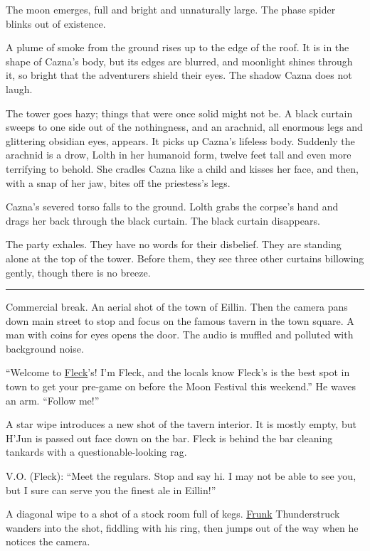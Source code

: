 \documentclass[smalldemyvopaper,11pt,twoside,onecolumn,openright,extrafontsizes]{memoir}
\begin{document}
The moon emerges, full and bright and unnaturally large. The phase
spider blinks out of existence.

A plume of smoke from the ground rises up to the edge of the roof. It is
in the shape of Cazna's body, but its edges are blurred, and moonlight
shines through it, so bright that the adventurers shield their eyes. The
shadow Cazna does not laugh.

The tower goes hazy; things that were once solid might not be. A black
curtain sweeps to one side out of the nothingness, and an arachnid, all
enormous legs and glittering obsidian eyes, appears. It picks up Cazna's
lifeless body. Suddenly the arachnid is a drow, Lolth in her humanoid
form, twelve feet tall and even more terrifying to behold. She cradles
Cazna like a child and kisses her face, and then, with a snap of her
jaw, bites off the priestess's legs.

Cazna's severed torso falls to the ground. Lolth grabs the corpse's hand
and drags her back through the black curtain. The black curtain
disappears.

The party exhales. They have no words for their disbelief. They are
standing alone at the top of the tower. Before them, they see three
other curtains billowing gently, though there is no breeze.

\begin{center}\rule{0.5\linewidth}{\linethickness}\end{center}

Commercial break. An aerial shot of the town of Eillin. Then the camera
pans down main street to stop and focus on the famous tavern in the town
square. A man with coins for eyes opens the door. The audio is muffled
and polluted with background noise.

``Welcome to \href{/characters/fleck/}{Fleck}'s! I'm Fleck, and the
locals know Fleck's is the best spot in town to get your pre-game on
before the Moon Festival this weekend.'' He waves an arm. ``Follow me!''

A star wipe introduces a new shot of the tavern interior. It is mostly
empty, but H'Jun is passed out face down on the bar. Fleck is behind the
bar cleaning tankards with a questionable-looking rag.

V.O. (Fleck): ``Meet the regulars. Stop and say hi. I may not be able to
see you, but I sure can serve you the finest ale in Eillin!''

A diagonal wipe to a shot of a stock room full of kegs.
\href{/characters/frunk/}{Frunk} Thunderstruck wanders into the shot,
fiddling with his ring, then jumps out of the way when he notices the
camera.
\end{document}
